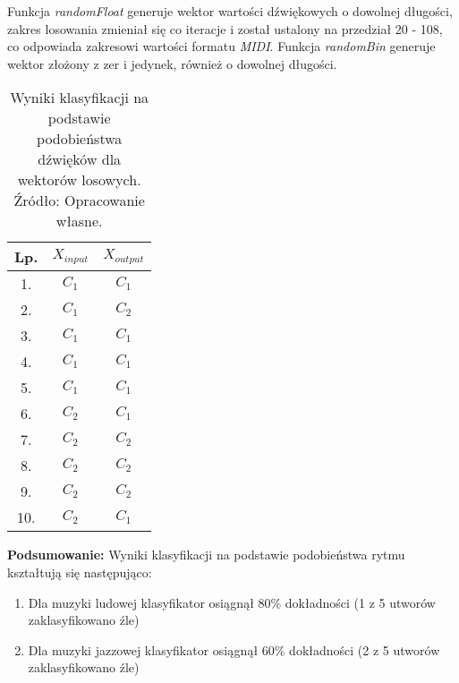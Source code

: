 Funkcja \textit{randomFloat} generuje wektor wartości dźwiękowych o dowolnej długości, zakres losowania zmieniał się co iteracje i został ustalony na przedział 20 - 108, co odpowiada zakresowi wartości formatu \textit{MIDI}. Funkcja \textit{randomBin} generuje wektor złożony z zer i jedynek, również o dowolnej długości.
\FloatBarrier
\begin{table}[h]
\begin{tabular}{|c|c|c|}
\hline
Lp. & $X_{input}$ & $X_{output}$ \\ \hline
1.   & $C_{1}$      & $C_{1}$      \\ \hline
2.   & $C_{1}$      & $C_{2}$     \\ \hline
3.   & $C_{1}$      & $C_{1}$      \\ \hline
4.   & $C_{1}$      & $C_{1}$     \\ \hline
5.   & $C_{1}$      & $C_{1}$      \\ \hline
6.   & $C_{2}$      & $C_{1}$    \\ \hline
7.   & $C_{2}$      & $C_{2}$     \\ \hline
8.   & $C_{2}$      & $C_{2}$     \\ \hline
9.   & $C_{2}$      & $C_{2}$     \\ \hline
10.  & $C_{2}$      & $C_{1}$      \\ \hline
\end{tabular}
\centering
\caption{Wyniki klasyfikacji na podstawie podobieństwa dźwięków dla wektorów losowych. Źródło: Opracowanie własne.}
\end{table}
\FloatBarrier

\textbf{Podsumowanie:}
Wyniki klasyfikacji na podstawie podobieństwa rytmu kształtują się następująco:

\begin{enumerate}
    \item Dla muzyki ludowej klasyfikator osiągnął 80\% dokładności (1 z 5 utworów zaklasyfikowano źle)
    \item Dla muzyki jazzowej klasyfikator osiągnął 60\% dokładności (2 z 5 utworów zaklasyfikowano źle)
\end{enumerate}

